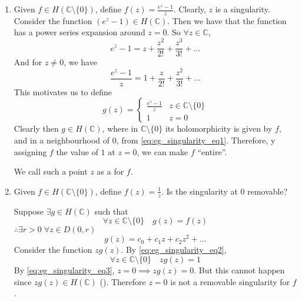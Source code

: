 \documentclass[notoc,notitlepage]{tufte-book}
\begin{document}
\begin{eg}
	\begin{enumerate}
		\item Given $f \in H(\mathbb{C} \setminus \{0\})$, define $f(z) = \frac{e^z - 1}{z}$. Clearly, $z$ is a singularity. Consider the function $(e^z - 1) \in H(\mathbb{C})$. Then we have that the function has a power series expansion around $z = 0$. So $\forall z \in \mathbb{C}$,
		\begin{equation*}
			e^z - 1 = z + \frac{z^2}{2!} + \frac{z^3}{3!} + \hdots
		\end{equation*}
		And for $z \neq 0$, we have
		\begin{equation}\label{eq:eg_singularity_eq1}
			\frac{e^z - 1}{z} = 1 + \frac{z}{2!} + \frac{z^2}{3!} + \hdots
		\end{equation}
		This motivates us to define
		\begin{equation*}
			g(z) = \begin{cases}
				\frac{e^z - 1}{z} 	& z \in \mathbb{C} \setminus \{0\} \\
				1					& z = 0
			\end{cases}
		\end{equation*}
		Clearly then $g \in H(\mathbb{C})$, where in $\mathbb{C} \setminus \{0\}$ its holomorphicity is given by $f$, and in a neighbourhood of $0$, from \cref{eq:eg_singularity_eq1}. Therefore, y assigning $f$ the value of $1$ at $z = 0$, we can make $f$ ``entire''.

		We call such a point $z$ as a  for $f$.

		\item Given $f \in H(\mathbb{C} \setminus \{0\})$, define $f(z) = \frac{1}{z}$. Is the singularity at $0$ removable?

		Suppose $\exists g \in H(\mathbb{C})$ such that
		\begin{equation}\label{eq:eg_singularity_eq2}
			\forall z \in \mathbb{C} \setminus \{0\} \quad g(z) = f(z)
		\end{equation}
		$\therefore \exists r > 0 \; \forall z \in D(0, r)$
		\begin{equation}\label{eq:eg_singularity_eq3}
			g(z) = c_0 + c_1 z + c_2 z^2 + \hdots
		\end{equation}
		Consider the function $zg(z)$. By \cref{eq:eg_singularity_eq2},
		\begin{equation*}
			\forall z \in \mathbb{C} \setminus \{0\} \quad zg(z) = 1
		\end{equation*}
		By \cref{eq:eg_singularity_eq3}, $z = 0 \implies zg(z) = 0$. But this cannot happen since $zg(z) \in H(\mathbb{C})$ (). Therefore $z = 0$ is not a removable singularity for $f$.
	\end{enumerate}
\end{eg}
\end{document}
